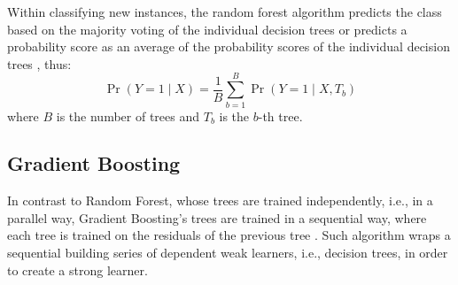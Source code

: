 Within classifying new instances, the random forest algorithm predicts the class based on the majority voting of the individual decision trees or predicts a probability score as an average of the probability scores of the individual decision trees \citep{randomforestmalley}, thus:
\begin{equation}
    \operatorname{Pr}\left(Y=1 \mid X \right) = \frac{1}{B} \sum_{b=1}^{B} \operatorname{Pr}\left(Y=1 \mid X, T_b \right)
\end{equation}
where $B$ is the number of trees and $T_b$ is the $b$-th tree.

\newpage
\subsection{Gradient Boosting}
In contrast to Random Forest, whose trees are trained independently, i.e., in a parallel way, Gradient Boosting's trees are trained in a sequential way, where each tree is trained on the residuals of the previous tree \citep{ayyadevara2018pro}. Such algorithm wraps a sequential building series of dependent weak learners, i.e., decision trees, in order to create a strong learner.

